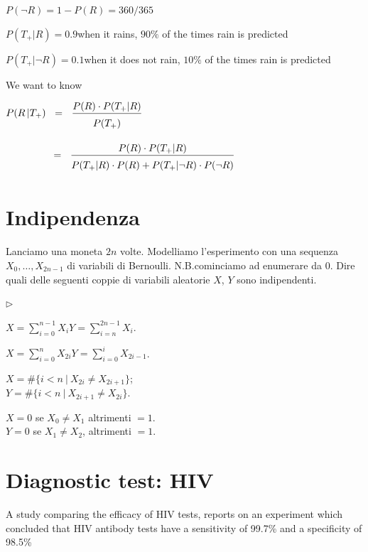 \documentclass[10pt,openany]{book}
\newcommand{\mylabel}[1]{{\footnotesize\textsf{#1}}\hfill}
\renewenvironment{itemize}
  {\begin{list}{$\triangleright$}{%
   \setlength{\parskip}{0mm}
   \setlength{\topsep}{.2\baselineskip}
   \setlength{\rightmargin}{0mm}
   \setlength{\listparindent}{0mm}
   \setlength{\itemindent}{0mm}
   \setlength{\labelwidth}{3ex}
   \setlength{\itemsep}{.4\baselineskip}
   \setlength{\parsep}{0mm}
   \setlength{\partopsep}{0mm}
   \setlength{\labelsep}{1ex}
   \setlength{\leftmargin}{\labelwidth+\labelsep}
   \let\makelabel\mylabel}}{%
   \end{list}\vspace*{-1.3mm}}
\theoremstyle{mio}
\theoremstyle{liscio}
\begin{document}
$P (\neg R) = 1-P(R)= 360/365$

$P (T_+|R) = 0.9$\hfill when it rains, $90\%$ of the times rain is predicted

$P (T_+|\neg R) = 0.1$\hfill when it does not rain, $10\%$ of the times rain is predicted

\bigskip
We want to know

$\displaystyle P(R\,| T_+)\medrel{=}\frac{P(R)\cdot P(T_+|R)}{P(T_+)\vphantom{\Big[}}$

$\displaystyle\hphantom{P(R | T_+)}\medrel{=}\frac{P(R)\cdot P(T_+|R)}{P(T_+|R)\cdot P(R)+ P(T_+|\neg R)\cdot P(\neg R)\vphantom{\Big[}}$


\clearpage\section{Indipendenza}
\label{esercizio_indipendenza}

Lanciamo una moneta $2n$ volte. Modelliamo l'esperimento con una sequenza $X_0,\dots,X_{2n-1}$ di variabili di Bernoulli. N.B.\@ cominciamo ad enumerare da $0$. Dire quali delle seguenti coppie di variabili aleatorie $X$, $Y$ sono indipendenti.\medskip

\begin{itemize}
\item[1.] $\displaystyle X=\sum_{i=0}^{n-1}X_i$\qquad $\displaystyle Y=\sum_{i=n}^{2n-1}X_i$.


\item[2.] $\displaystyle X=\sum_{i=0}^{n}X_{2i}$\qquad $\displaystyle Y=\sum_{i=0}^{i} X_{2i-1}$.\bigskip

\item[3.] $X= \#\big\{i<n\ |\ X_{2i}\neq X_{2i+1}\big\}$;\\
$Y= \#\big\{i<n\ |\ X_{2i+1}\neq X_{2i}\big\}$.\bigskip

\item[4.] $X=0$ se $X_0\neq X_1$ altrimenti $=1$. \\
$Y=0$ se $X_1\neq X_2$, altrimenti $=1$.

\end{itemize}



\clearpage\section{Diagnostic test: HIV}
\label{HIV_test}

A study comparing the efficacy of HIV tests, reports on an
experiment which concluded that HIV antibody tests have a
{\color{brown}sensitivity of 99.7\%} and a {\color{brown}specificity of 98.5\%}
\end{document}
